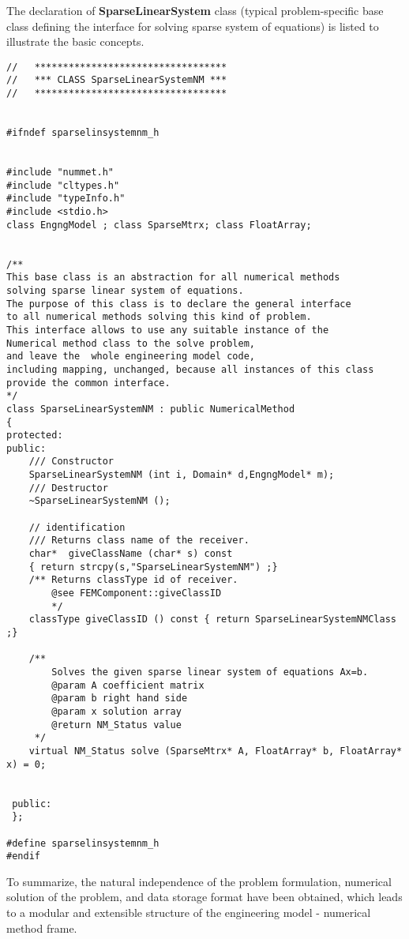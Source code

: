 \documentclass[a4paper]{article}
\newcommand{\class}[1]{{\bf #1}}
\begin{document}
The declaration of \class{SparseLinearSystem} class (typical
problem-specific base class defining the interface for solving sparse
system of equations) is listed to
illustrate the basic concepts.
{\small\begin{verbatim}
//   **********************************
//   *** CLASS SparseLinearSystemNM ***
//   **********************************

 
#ifndef sparselinsystemnm_h


#include "nummet.h"
#include "cltypes.h"
#include "typeInfo.h"
#include <stdio.h>
class EngngModel ; class SparseMtrx; class FloatArray; 


/**
This base class is an abstraction for all numerical methods
solving sparse linear system of equations. 
The purpose of this class is to declare the general interface
to all numerical methods solving this kind of problem. 
This interface allows to use any suitable instance of the 
Numerical method class to the solve problem,
and leave the  whole engineering model code,
including mapping, unchanged, because all instances of this class
provide the common interface.
*/
class SparseLinearSystemNM : public NumericalMethod
{
protected:
public:
	/// Constructor
	SparseLinearSystemNM (int i, Domain* d,EngngModel* m);
	/// Destructor
	~SparseLinearSystemNM ();

	// identification 
	/// Returns class name of the receiver.
	char*  giveClassName (char* s) const 
	{ return strcpy(s,"SparseLinearSystemNM") ;}
	/** Returns classType id of receiver.
		@see FEMComponent::giveClassID 
		*/
	classType giveClassID () const { return SparseLinearSystemNMClass ;}

	/**
		Solves the given sparse linear system of equations Ax=b.
		@param A coefficient matrix 
		@param b right hand side
		@param x solution array
		@return NM_Status value
	 */
	virtual NM_Status solve (SparseMtrx* A, FloatArray* b, FloatArray* x) = 0;


 public:
 };

#define sparselinsystemnm_h
#endif
\end{verbatim}}

To summarize, the natural independence of the problem formulation,
numerical solution of the problem, and data storage format have been
obtained, which leads to a modular and extensible structure of the engineering
model - numerical method frame.
\end{document}
